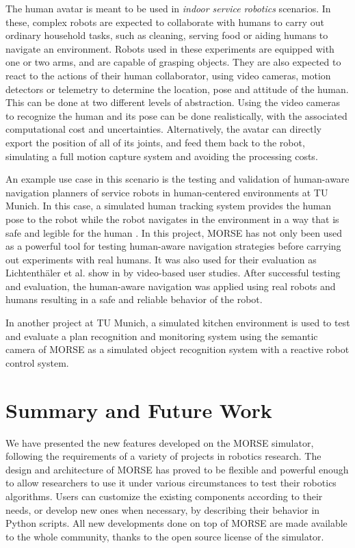 \documentclass{llncs}
\newcommand{\serge}[1]{\nb{Serge}{blue}{#1}}
\begin{document}
The human avatar is meant to be used in \emph{indoor service robotics} scenarios.
In these, complex robots are expected to collaborate with humans to carry out
ordinary household tasks, such as cleaning, serving food or aiding humans to
navigate an environment.
Robots used in these experiments are equipped with one or two arms, and are
capable of grasping objects. They are also expected to react to the actions of
their human collaborator, using video cameras, motion detectors or telemetry to
determine the location, pose and attitude of the human.
This can be done at two different levels of
abstraction. Using the video cameras to recognize the human and its pose can be
done realistically, with the associated computational cost and uncertainties.
Alternatively, the avatar can directly export the position of all of its
joints, and feed them back to the robot, simulating a full motion capture
system and avoiding the processing costs.


An example use case in this scenario is the testing and validation of human-aware
navigation planners of service robots in human-centered environments at TU Munich.
In this case, a simulated human tracking system provides the human pose to the
robot while the robot navigates in the environment in a way that is safe and
legible for the human \cite{kruse10exploiting}. In this project, MORSE has not only been used as a
powerful tool for testing human-aware navigation strategies before carrying out
experiments with real humans. It was also used for their evaluation as
Lichtenth{\"a}ler et al. show in \cite{lichtenthaeler2012increasing} by
video-based user studies. After successful testing and evaluation, the
human-aware navigation was applied using real robots and humans resulting in
a safe and reliable behavior of the robot.

In another project at TU Munich, a simulated kitchen environment is used
to test and evaluate a plan recognition and monitoring system using the
semantic camera of MORSE as a simulated object recognition system with
a reactive robot control system.


\section{Summary and Future Work}
\label{section:discussion}

We have presented the new features developed on the MORSE simulator,
following the requirements of a variety of projects in robotics research.
The design and architecture of MORSE has proved to be flexible and powerful
enough to allow researchers to use it under various circumstances to test their
robotics algorithms. Users can customize the existing components according to
their needs, or develop new ones when necessary, by describing their behavior
in Python scripts.
All new developments done on top of MORSE are made available to the whole
community, thanks to the open source license of the simulator.
\end{document}
